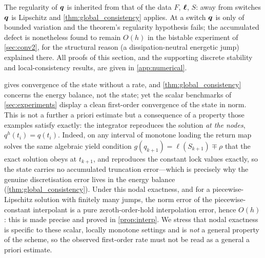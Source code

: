 The regularity of $\bm{q}$ is inherited from that of the data $F$,
$\bm{\ell}$, $S$: away from switches $\bm{q}$ is Lipschitz and
\cref{thm:global_consistency} applies. At a switch $\bm{q}$ is only of
bounded variation and the theorem's regularity hypothesis fails; the
accumulated defect is nonetheless found to remain $O(h)$ in the bistable
experiment of \cref{sec:conv2}, for the structural reason (a
dissipation-neutral energetic jump) explained there. All proofs of this
section, and the supporting discrete stability and local-consistency
results, are given in \cref{app:numerical}.

\begin{remark}
\label{rem:nodal}
 gives convergence of the state without a rate,
and \cref{thm:global_consistency} concerns the energy balance, not the
state; yet the scalar benchmarks of \cref{sec:experiments} display a
clean first-order convergence of the state in norm. This is not a
further a priori estimate but a consequence of a property those examples
satisfy exactly: the integrator reproduces the solution \emph{at the
nodes}, $q^h(t_i)=q(t_i)$. Indeed, on any interval of monotone loading
the return map solves the same algebraic yield condition
$g(q_{k+1})=\ell(S_{k+1})\mp\rho$ that the exact solution obeys at
$t_{k+1}$, and reproduces the constant lock values exactly, so the state
carries no accumulated truncation error---which is precisely why the
genuine discretisation error lives in the energy balance
(\cref{thm:global_consistency}). Under this nodal exactness, and for a
piecewise-Lipschitz solution with finitely many jumps, the norm error of
the piecewise-constant interpolant is a pure zeroth-order-hold
interpolation error, hence $O(h)$: this is made precise and proved in
\cref{prop:interp}. We stress that nodal exactness is specific to these
scalar, locally monotone settings and is \emph{not} a general property
of the scheme, so the observed first-order rate must not be read as a
general a priori estimate.
\end{remark}
